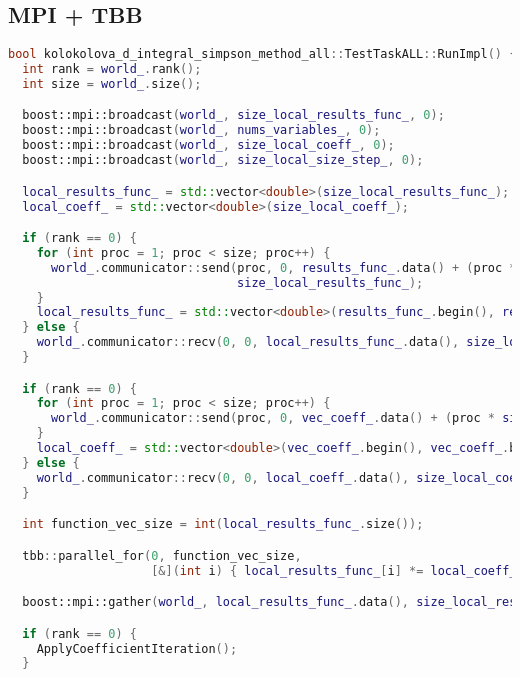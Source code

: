 \documentclass[12pt]{article}
\begin{document}
\subsection*{MPI + TBB}
\begin{lstlisting}[language=C++]
bool kolokolova_d_integral_simpson_method_all::TestTaskALL::RunImpl() {
  int rank = world_.rank();
  int size = world_.size();

  boost::mpi::broadcast(world_, size_local_results_func_, 0);
  boost::mpi::broadcast(world_, nums_variables_, 0);
  boost::mpi::broadcast(world_, size_local_coeff_, 0);
  boost::mpi::broadcast(world_, size_local_size_step_, 0);

  local_results_func_ = std::vector<double>(size_local_results_func_);
  local_coeff_ = std::vector<double>(size_local_coeff_);

  if (rank == 0) {
    for (int proc = 1; proc < size; proc++) {
      world_.communicator::send(proc, 0, results_func_.data() + (proc * size_local_results_func_),
                                size_local_results_func_);
    }
    local_results_func_ = std::vector<double>(results_func_.begin(), results_func_.begin() + size_local_results_func_);
  } else {
    world_.communicator::recv(0, 0, local_results_func_.data(), size_local_results_func_);
  }

  if (rank == 0) {
    for (int proc = 1; proc < size; proc++) {
      world_.communicator::send(proc, 0, vec_coeff_.data() + (proc * size_local_coeff_), size_local_coeff_);
    }
    local_coeff_ = std::vector<double>(vec_coeff_.begin(), vec_coeff_.begin() + size_local_coeff_);
  } else {
    world_.communicator::recv(0, 0, local_coeff_.data(), size_local_coeff_);
  }

  int function_vec_size = int(local_results_func_.size());

  tbb::parallel_for(0, function_vec_size,
                    [&](int i) { local_results_func_[i] *= local_coeff_[i % local_coeff_.size()]; });

  boost::mpi::gather(world_, local_results_func_.data(), size_local_results_func_, results_func_, 0);

  if (rank == 0) {
    ApplyCoefficientIteration();
  }
\end{lstlisting}
\newpage
\end{document}
